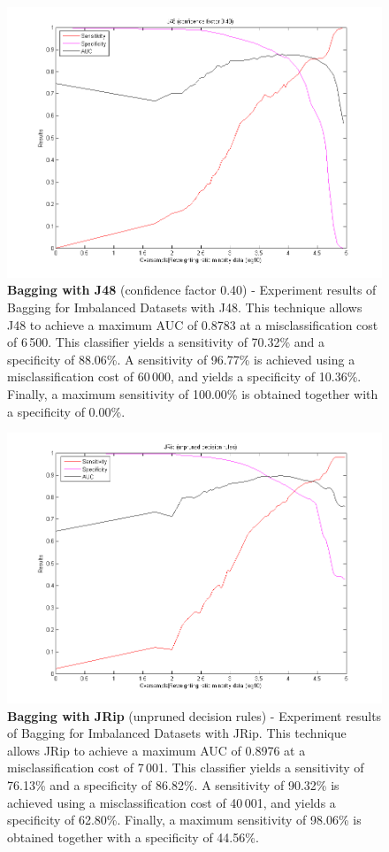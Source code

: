 \begin{figure}[h]
\includegraphics[scale=0.65]{img/bi_J48-confid040.png}
\caption{\textbf{Bagging with J48} (confidence factor 0.40) - Experiment results of Bagging for Imbalanced Datasets with J48. This technique allows J48 to achieve a maximum AUC of 0.8783 at a misclassification cost of 6\,500. This classifier yields a sensitivity of 70.32\% and a specificity of 88.06\%. A sensitivity of 96.77\% is achieved using a misclassification cost of 60\,000, and yields a specificity of 10.36\%. Finally, a maximum sensitivity of 100.00\% is obtained together with a specificity of 0.00\%.}
\end{figure}

\newpage
\begin{figure}[h]
\includegraphics[scale=0.65]{img/bi_JRip-unpruned.png}
\caption{\textbf{Bagging with JRip} (unpruned decision rules) - Experiment results of Bagging for Imbalanced Datasets with JRip. This technique allows JRip to achieve a maximum AUC of 0.8976 at a misclassification cost of 7\,001. This classifier yields a sensitivity of 76.13\% and a specificity of 86.82\%. A sensitivity of 90.32\% is achieved using a misclassification cost of 40\,001, and yields a specificity of 62.80\%. Finally, a maximum sensitivity of 98.06\% is obtained together with a specificity of 44.56\%.}
\end{figure}

